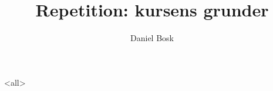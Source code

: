 \documentclass[ignoreframetext]{beamer}
\begin{document}
\title{%
  Repetition: kursens grunder
}
\author{Daniel Bosk}

\begin{frame}
  \maketitle
\end{frame}

\mode<all>

\mode*
%
\end{document}

